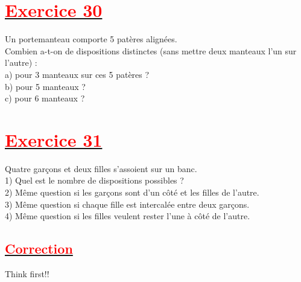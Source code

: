 \documentclass[12pt]{article}
\begin{document}
\section*{\underline{\textbf{\textcolor{red}{Exercice 30}}}}
Un portemanteau comporte 5 patères alignées.\\ 
Combien a-t-on de dispositions distinctes (sans mettre deux manteaux l’un sur l’autre) :\\
a) pour 3 manteaux sur ces 5 patères ?\\
b) pour 5 manteaux ?\\
c) pour 6 manteaux ?\\
\section*{\underline{\textbf{\textcolor{red}{Exercice 31}}}}
Quatre garçons et deux filles s’assoient sur un banc.\\
1) Quel est le nombre de dispositions possibles ?\\
2) Même question si les garçons sont d’un côté et les filles de l’autre.\\
3) Même question si chaque fille est intercalée entre deux garçons.\\
4) Même question si les filles veulent rester l’une à côté de l’autre.\\
\newpage
\begin{center}
\section*{\underline{\textbf{\textcolor{red}{Correction}}}}
Think first!!
\end{center}
\end{document}
